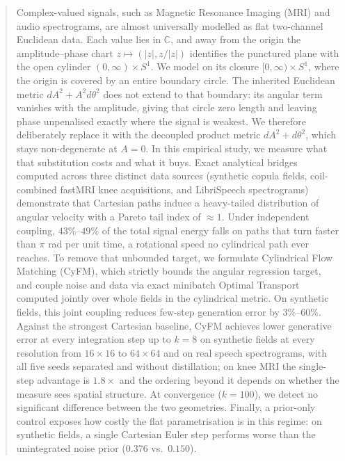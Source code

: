 \begin{abstract}
Complex-valued signals, such as Magnetic Resonance Imaging (MRI) and audio spectrograms, are almost universally modelled as flat two-channel Euclidean data. Each value lies in $\mathbb{C}$, and away from the origin the amplitude--phase chart $z \mapsto (|z|, z/|z|)$ identifies the punctured plane with the open cylinder $(0, \infty) \times S^1$. We model on its closure $[0, \infty) \times S^1$, where the origin is covered by an entire boundary circle. The inherited Euclidean metric $dA^2 + A^2 d\theta^2$ does not extend to that boundary: its angular term vanishes with the amplitude, giving that circle zero length and leaving phase unpenalised exactly where the signal is weakest. We therefore deliberately replace it with the decoupled product metric $dA^2 + d\theta^2$, which stays non-degenerate at $A = 0$. In this empirical study, we measure what that substitution costs and what it buys. Exact analytical bridges computed across three distinct data sources (synthetic copula fields, coil-combined fastMRI knee acquisitions, and LibriSpeech spectrograms) demonstrate that Cartesian paths induce a heavy-tailed distribution of angular velocity with a Pareto tail index of $\approx 1$. Under independent coupling, $43\%$--$49\%$ of the total signal energy falls on paths that turn faster than $\pi$ rad per unit time, a rotational speed no cylindrical path ever reaches. To remove that unbounded target, we formulate Cylindrical Flow Matching (CyFM), which strictly bounds the angular regression target, and couple noise and data via exact minibatch Optimal Transport computed jointly over whole fields in the cylindrical metric. On synthetic fields, this joint coupling reduces few-step generation error by $3\%$--$60\%$. Against the strongest Cartesian baseline, CyFM achieves lower generative error at every integration step up to $k = 8$ on synthetic fields at every resolution from $16\times16$ to $64\times64$ and on real speech spectrograms, with all five seeds separated and without distillation; on knee MRI the single-step advantage is $1.8\times$ and the ordering beyond it depends on whether the measure sees spatial structure. At convergence ($k = 100$), we detect no significant difference between the two geometries. Finally, a prior-only control exposes how costly the flat parametrisation is in this regime: on synthetic fields, a single Cartesian Euler step performs worse than the unintegrated noise prior ($0.376$ vs.\ $0.150$).
\end{abstract}
